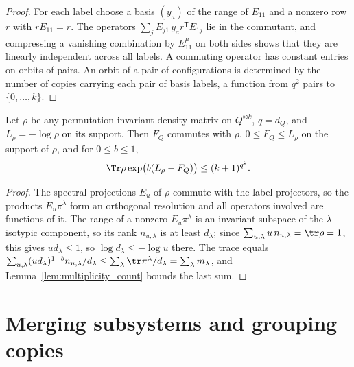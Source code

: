 \begin{proof}\leanok
    For each label choose a basis $(y_a)$ of the range of $E_{11}$ and a
    nonzero row $r$ with $rE_{11}=r$. The operators
    $\sum_jE_{j1}\,y_ar^{\mathsf T}E_{1j}$ lie in the commutant, and
    compressing a vanishing combination by $E^\mu_{11}$ on both sides shows
    that they are linearly independent across all labels. A commuting operator
    has constant entries on orbits of pairs. An orbit of a pair of
    configurations is determined by the number of copies carrying each pair of
    basis labels, a function from $q^2$ pairs to $\{0,\dots,k\}$.
\end{proof}

\begin{theorem}
    \label{thm:schur_label_surprisal}
    \leanok
    Let $\rho$ be any permutation-invariant density matrix on $Q^{\otimes k}$,
    $q=d_Q$, and $L_\rho=-\log\rho$ on its support. Then $F_Q$ commutes with
    $\rho$, $0\le F_Q\le L_\rho$ on the support of $\rho$, and for
    $0\le b\le1$,
    \[
        \Tr\rho\exp\bigl(b(L_\rho-F_Q)\bigr)\le(k+1)^{q^2}.
    \]
\end{theorem}

\begin{proof}\leanok
    The spectral projections $E_u$ of $\rho$ commute with the label
    projectors, so the products $E_u\pi^\lambda$ form an orthogonal resolution
    and all operators involved are functions of it. The range of a nonzero
    $E_u\pi^\lambda$ is an invariant subspace of the $\lambda$-isotypic
    component, so its rank $n_{u,\lambda}$ is at least $d_\lambda$; since
    $\sum_{u,\lambda}u\,n_{u,\lambda}=\tr\rho=1$, this gives $ud_\lambda\le1$,
    so $\log d_\lambda\le-\log u$ there. The trace equals
    $\sum_{u,\lambda}(ud_\lambda)^{1-b}n_{u,\lambda}/d_\lambda
    \le\sum_\lambda\tr\pi^\lambda/d_\lambda=\sum_\lambda m_\lambda$, and
    Lemma~\ref{lem:multiplicity_count} bounds the last sum.
\end{proof}

\section{Merging subsystems and grouping copies}

